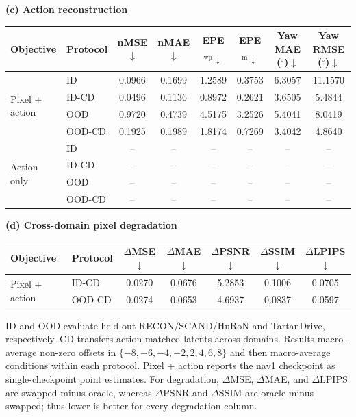 \documentclass{article}
\newcommand{\TBD}{\textcolor{gray}{--}}
\begin{document}
\begin{table}[t]
  \vspace{7pt}
  \textbf{(c) Action reconstruction}\par\vspace{2pt}
  \begin{tabular}{ll cccccc}
    \toprule
    Objective & Protocol
    & nMSE $\downarrow$ & nMAE $\downarrow$
    & EPE$_{\mathrm{wp}}\downarrow$ & EPE$_{\mathrm{m}}\downarrow$
    & Yaw MAE ($^\circ$)$\downarrow$ & Yaw RMSE ($^\circ$)$\downarrow$ \\
    \midrule
    \multirow{4}{*}{Pixel + action}
    & ID & 0.0966 & 0.1699 & 1.2589 & 0.3753 & 6.3057 & 11.1570 \\
    & ID-CD & 0.0496 & 0.1136 & 0.8972 & 0.2621 & 3.6505 & 5.4844 \\
    & OOD & 0.9720 & 0.4739 & 4.5175 & 3.2526 & 5.4041 & 8.0419 \\
    & OOD-CD & 0.1925 & 0.1989 & 1.8174 & 0.7269 & 3.4042 & 4.8640 \\
    \midrule
    \multirow{4}{*}{Action only}
    & ID & \TBD & \TBD & \TBD & \TBD & \TBD & \TBD \\
    & ID-CD & \TBD & \TBD & \TBD & \TBD & \TBD & \TBD \\
    & OOD & \TBD & \TBD & \TBD & \TBD & \TBD & \TBD \\
    & OOD-CD & \TBD & \TBD & \TBD & \TBD & \TBD & \TBD \\
    \bottomrule
  \end{tabular}

  \vspace{7pt}
  \textbf{(d) Cross-domain pixel degradation}\par\vspace{2pt}
  \begin{tabular}{ll ccccc}
    \toprule
    Objective & Protocol & $\Delta$MSE $\downarrow$ & $\Delta$MAE $\downarrow$
    & $\Delta$PSNR $\downarrow$ & $\Delta$SSIM $\downarrow$
    & $\Delta$LPIPS $\downarrow$ \\
    \midrule
    \multirow{2}{*}{Pixel + action}
    & ID-CD & 0.0270 & 0.0676 & 5.2853 & 0.1006 & 0.0705 \\
    & OOD-CD & 0.0274 & 0.0653 & 4.6937 & 0.0837 & 0.0597 \\
    \bottomrule
  \end{tabular}

  \vspace{3pt}
  \parbox{0.96\textwidth}{\footnotesize
  ID and OOD evaluate held-out RECON/SCAND/HuRoN and TartanDrive,
  respectively. CD transfers action-matched latents across domains. Results
  macro-average non-zero offsets in $\{-8,-6,-4,-2,2,4,6,8\}$ and then
  macro-average conditions within each protocol. Pixel + action reports the
  nav1 checkpoint as single-checkpoint point estimates. For degradation,
  $\Delta$MSE, $\Delta$MAE, and
  $\Delta$LPIPS are swapped minus oracle, whereas $\Delta$PSNR and
  $\Delta$SSIM are oracle minus swapped; thus lower is better for every
  degradation column.}
\end{table}
\end{document}

